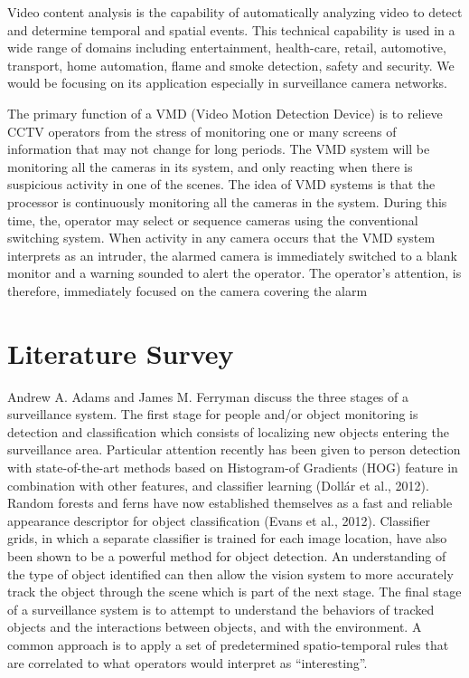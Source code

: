 \documentclass[12pt]{article}
\begin{document}
\noindent
Video content analysis is the capability of automatically analyzing video to detect and determine temporal and spatial events. This technical capability is used in a wide range of domains including entertainment, health-care, retail, automotive, transport, home automation, flame and smoke detection, safety and security. We would be focusing on its application especially in surveillance camera networks.
\newline

\noindent
The primary function of a VMD (Video Motion Detection Device) is to relieve CCTV operators from the stress of monitoring one or many screens of information that may not change for long periods. The VMD system will be monitoring all the cameras in its system, and only reacting when there is suspicious activity in one of the scenes. The idea of VMD systems is that the processor is continuously monitoring all the cameras in the system. During this time, the, operator may select or sequence cameras using the conventional switching system. When activity in any camera occurs that the VMD system interprets as an intruder, the alarmed camera is immediately switched to a blank monitor and a warning sounded to alert the operator. The operator’s attention, is therefore, immediately focused on the camera covering the alarm

\section{Literature Survey}

Andrew A. Adams and James M. Ferryman \cite{num:1} discuss the three stages of a surveillance system. The first stage for people and/or object monitoring is detection and classification which consists of localizing new objects entering the surveillance area. Particular attention recently has been given to person detection with state-of-the-art methods based on Histogram-of Gradients (HOG) feature in combination with other features, and classifier learning (Dollár et al., 2012). Random forests and ferns have now established themselves as a fast and reliable appearance descriptor for object classification (Evans et al., 2012). Classifier grids, in which a separate classifier is trained for each image location, have also been shown to be a powerful method for object detection. An understanding of the type of object identified can then allow the vision system to more accurately track the object through the scene which is part of the next stage. The final stage of a surveillance system is to attempt to understand the behaviors of tracked objects and the interactions between objects, and with the environment. A common approach is to apply a set of predetermined spatio-temporal rules that are correlated to what operators would interpret as “interesting”.
\newline
\end{document}
